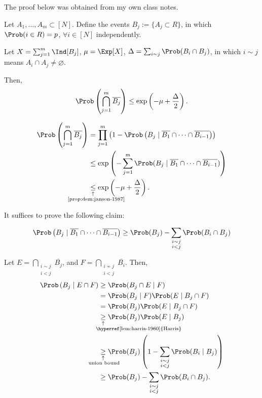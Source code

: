 \documentclass[10pt, a4paper]{article}
\newcommand{\signexpl}[3]{%
  \underset{\substack{\uparrow\\\mathrlap{\text{\hspace{#3}#2}}}}{#1}}
\begin{document}
\begin{rem}
	The proof below was obtained from my own class notes.
\end{rem}
\begin{thm}[Janson, 1987]\label{thm:janson-1987}
	Let $A_1, \dots, A_m \subset [N]$. Define the events $B_j := \{A_j \subset R\}$, in which $\Prob(i \in R) = p$, $\forall i \in [N]$ independently.

	Let $X = \sum_{j=1}^m \Ind[B_j]$,  $\mu = \Exp[X]$,  $\Delta = \sum_{i \sim j} \Prob(B_i \cap B_j)$, in which  $i \sim j$ means $A_i \cap A_j \neq \varnothing$.

	Then, \[
		\Prob\left( \bigcap_{j=1}^m \overline{B_j}\right) \le
			\exp\left(-\mu + \frac{\Delta}{2}\right).
	\]
\end{thm}
\begin{dem}
	\begin{align*}
		\Prob\left(\bigcap_{j=1}^{m} \overline{B_j}\right) &= \prod_{j=1}^{m} \left( 1 - \Prob\left( B_j \mid \overline{B_1} \cap \cdots \cap \overline{B_{i-1}}\right)\right)\\
		&\le \exp\left(- \sum_{j=1}^m \Prob(B_j \mid \overline{B_1} \cap \cdots \cap \overline{B_{i-1}})\right)\\
		&\signexpl{\le}{\cref{prop:dem:janson-1987}}{-4.5em} \exp\left(-\mu + \frac{\Delta}{2}\right).
	\end{align*}

	It suffices to prove the following claim:

	\begin{prop}\label{prop:dem:janson-1987}
		\[
		\Prob\left(B_j \mid \overline{B_1} \cap \cdots \cap \overline{B_{i-1}}\right) \ge \Prob(B_j) - \sum_{\substack{i\sim j \\ i < j}}\Prob(B_i \cap B_j)
		\]
	\end{prop}
	\begin{dem}
		Let $E = \bigcap_{\substack{i \sim j \\ i < j}}\overline{B_j}$, and $F = \bigcap_{\substack{i\not\sim j \\ i < j}} \overline{B_i}$. Then,
		\begin{align*}
			\Prob\left(B_j \mid E \cap F\right)
			&\ge \Prob(B_j \cap E \mid F) \\
			&= \Prob(B_j \mid F) \Prob(E \mid B_j \cap F)\\
			&= \Prob(B_j)\Prob(E \mid B_j \cap F)\\
			&\signexpl{\ge}{\hyperref[lem:harris-1960]{Harris}}{-1.3em} \Prob(B_j) \Prob(E \mid B_j)\\
			&\signexpl{\ge}{union bound}{-2.6em} \Prob(B_j) \left(1 - \sum_{\substack{i \sim j \\ i < j}}\Prob(B_i \mid B_j)\right)\\
			&\ge \Prob(B_j) - \sum_{\substack{i \sim j \\ i < j}}\Prob(B_i \cap B_j).
		\end{align*}
	\end{dem}
\end{dem}
\end{document}
